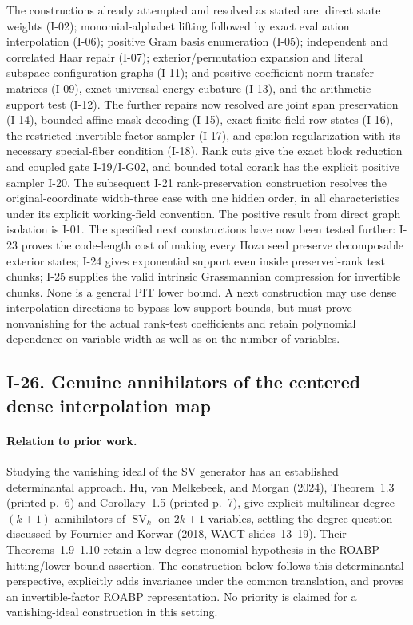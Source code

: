 The constructions already attempted and resolved as stated are:
direct state weights (I-02); monomial-alphabet lifting followed
by exact evaluation interpolation (I-06); positive Gram basis
enumeration (I-05); independent and correlated Haar repair
(I-07); exterior/permutation expansion and literal subspace
configuration graphs (I-11); and positive coefficient-norm
transfer matrices (I-09), exact universal energy cubature (I-13),
and the arithmetic support test (I-12).  The further repairs now
resolved are joint span preservation (I-14), bounded affine mask
decoding (I-15), exact finite-field row states (I-16), the restricted
invertible-factor sampler (I-17), and epsilon regularization with
its necessary special-fiber condition (I-18).  Rank cuts give the exact
block reduction and coupled gate I-19/I-G02, and bounded total corank
has the explicit positive sampler I-20.  The subsequent I-21
rank-preservation construction resolves the original-coordinate
width-three case with one hidden order, in all characteristics
under its explicit working-field convention.  The positive result from
direct graph isolation is I-01.  The specified next constructions have now been tested further:
I-23 proves the code-length cost of making every Hoza seed preserve
decomposable exterior states; I-24 gives exponential support even
inside preserved-rank test chunks; I-25 supplies the valid intrinsic
Grassmannian compression for invertible chunks.  None is a general
PIT lower bound.  A next construction may use dense interpolation
directions to bypass low-support bounds, but must prove nonvanishing
for the actual rank-test coefficients and retain polynomial dependence
on variable width as well as on the number of variables.


\subsection{I-26. Genuine annihilators of the centered dense interpolation map}
\label{I-26}

\paragraph{Relation to prior work.}
Studying the vanishing ideal of the SV generator has an established
determinantal approach.  Hu, van Melkebeek, and Morgan (2024),
Theorem~1.3 (printed p.~6) and Corollary~1.5 (printed p.~7), give explicit
multilinear degree-$(k+1)$ annihilators of $\operatorname{SV}_k$
on $2k+1$ variables, settling the degree question discussed by
Fournier and Korwar (2018, WACT slides~13--19).
Their Theorems~1.9--1.10 retain a low-degree-monomial hypothesis
in the ROABP hitting/lower-bound assertion.  The construction
below follows this determinantal perspective, explicitly adds
invariance under the common translation, and proves an
invertible-factor ROABP representation.  No priority is claimed
for a vanishing-ideal construction in this setting.

